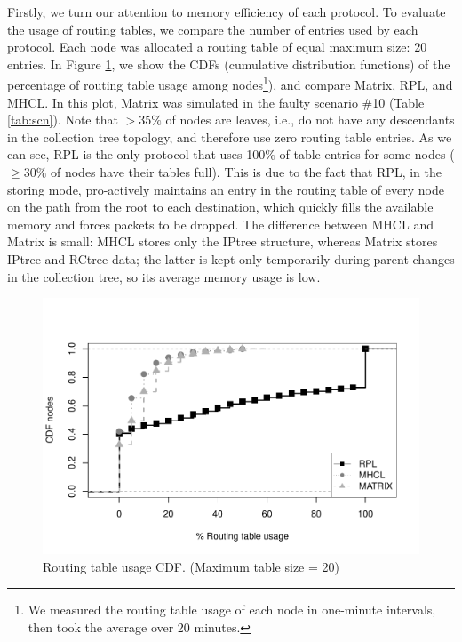 Firstly, we turn our attention to memory efficiency of each protocol.
To evaluate the usage of routing tables, we compare the number of entries used
by each protocol. Each node was allocated a routing table of equal maximum size:
20 entries.
In Figure \ref{fig:table-usage}, we show the CDFs (cumulative distribution
functions) of the percentage of routing table usage among nodes\footnote{We
measured the routing table usage of each node in one-minute intervals, then
took the average over 20 minutes. }), and compare Matrix,
RPL, and MHCL.
In this plot, Matrix was simulated in the faulty scenario \#10 (Table \ref{tab:scn}).
Note that $>35\%$ of nodes are leaves,
i.e., do not have any descendants in the collection tree topology,
and therefore use zero routing table entries.
As we can see, RPL is the only protocol that uses 100\% of table
entries for some nodes ($\geq30\%$ of nodes have their tables full).
This is due to the fact that RPL, in the storing mode, pro-actively
maintains an entry in the routing table of every node on the path
from the root to each destination, which quickly fills the available
memory and forces packets to be dropped. 
The difference between MHCL and Matrix is small: MHCL
stores only the IPtree structure, whereas Matrix stores IPtree and
RCtree data; the latter is kept only temporarily during parent
changes in the collection tree, so its average memory usage is low.

\begin{figure}[h]
    \centering
    \includegraphics[width=1\linewidth]{Images/tableentries.pdf}
    \caption{Routing table usage CDF. (Maximum table size = 20)}
    \label{fig:table-usage}
\end{figure}

